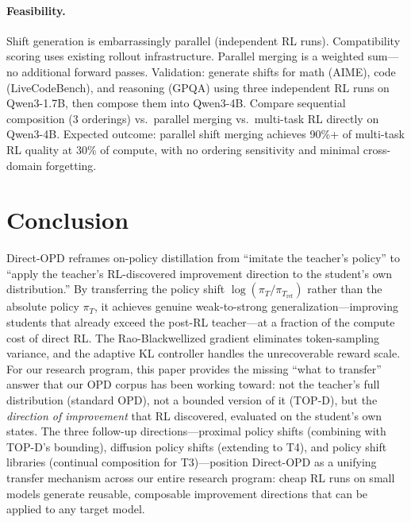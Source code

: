 \documentclass[11pt,a4paper]{article}
\begin{document}
\paragraph{Feasibility.} Shift generation is embarrassingly parallel (independent RL runs). Compatibility scoring uses existing rollout infrastructure. Parallel merging is a weighted sum---no additional forward passes. Validation: generate shifts for math (AIME), code (LiveCodeBench), and reasoning (GPQA) using three independent RL runs on Qwen3-1.7B, then compose them into Qwen3-4B. Compare sequential composition (3 orderings) vs.\ parallel merging vs.\ multi-task RL directly on Qwen3-4B. Expected outcome: parallel shift merging achieves 90\%+ of multi-task RL quality at 30\% of compute, with no ordering sensitivity and minimal cross-domain forgetting.

\section{Conclusion}

Direct-OPD reframes on-policy distillation from ``imitate the teacher's policy'' to ``apply the teacher's RL-discovered improvement direction to the student's own distribution.'' By transferring the policy shift $\log(\pi_T / \pi_{T_\mathrm{ref}})$ rather than the absolute policy $\pi_T$, it achieves genuine weak-to-strong generalization---improving students that already exceed the post-RL teacher---at a fraction of the compute cost of direct RL. The Rao-Blackwellized gradient eliminates token-sampling variance, and the adaptive KL controller handles the unrecoverable reward scale. For our research program, this paper provides the missing ``what to transfer'' answer that our OPD corpus has been working toward: not the teacher's full distribution (standard OPD), not a bounded version of it (TOP-D), but the \emph{direction of improvement} that RL discovered, evaluated on the student's own states. The three follow-up directions---proximal policy shifts (combining with TOP-D's bounding), diffusion policy shifts (extending to T4), and policy shift libraries (continual composition for T3)---position Direct-OPD as a unifying transfer mechanism across our entire research program: cheap RL runs on small models generate reusable, composable improvement directions that can be applied to any target model.
\end{document}
